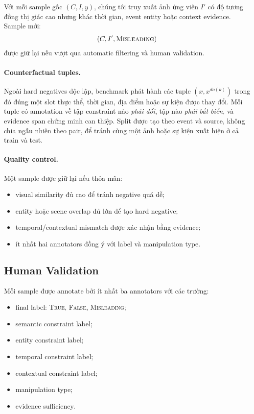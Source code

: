 \documentclass[11pt,a4paper]{article}
\newcommand{\True}{\textsc{True}}
\newcommand{\False}{\textsc{False}}
\newcommand{\Misleading}{\textsc{Misleading}}
\begin{document}
Với mỗi sample gốc $(C,I,y)$, chúng tôi truy xuất ảnh ứng viên $I'$ có độ tương đồng thị giác cao nhưng khác thời gian, event entity hoặc context evidence. Sample mới:
\[
(C,I',\Misleading)
\]
được giữ lại nếu vượt qua automatic filtering và human validation.

\paragraph{Counterfactual tuples.}
Ngoài hard negatives độc lập, benchmark phát hành các tuple $(x,x^{do(k)})$ trong đó đúng một slot thực thể, thời gian, địa điểm hoặc sự kiện được thay đổi. Mỗi tuple có annotation về tập constraint nào \emph{phải đổi}, tập nào \emph{phải bất biến}, và evidence span chứng minh can thiệp. Split được tạo theo event và source, không chia ngẫu nhiên theo pair, để tránh cùng một ảnh hoặc sự kiện xuất hiện ở cả train và test.

\paragraph{Quality control.}
Một sample được giữ lại nếu thỏa mãn:
\begin{itemize}[leftmargin=1.5em]
\item visual similarity đủ cao để tránh negative quá dễ;
\item entity hoặc scene overlap đủ lớn để tạo hard negative;
\item temporal/contextual mismatch được xác nhận bằng evidence;
\item ít nhất hai annotators đồng ý với label và manipulation type.
\end{itemize}

\subsection{Human Validation}

Mỗi sample được annotate bởi ít nhất ba annotators với các trường:

\begin{itemize}[leftmargin=1.5em]
\item final label: \True, \False, \Misleading;
\item semantic constraint label;
\item entity constraint label;
\item temporal constraint label;
\item contextual constraint label;
\item manipulation type;
\item evidence sufficiency.
\end{itemize}
\end{document}
